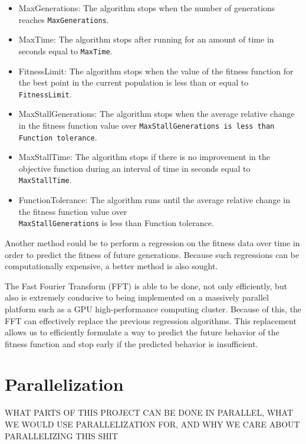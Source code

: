 \documentclass{article}
\renewcommand{\_}{\ifincsname_\else\legacyunderscore\fi}
\begin{document}
\begin{itemize}
    \item MaxGenerations: The algorithm stops when the number of generations reaches \texttt{MaxGenerations}.
    
    \item MaxTime: The algorithm stops after running for an amount of time in seconds equal to \texttt{MaxTime}.
    
    \item FitnessLimit: The algorithm stops when the value of the fitness function for the best point in the current population is less than or equal to \texttt{FitnessLimit}.
    
    \item MaxStallGenerations: The algorithm stops when the average relative change in the fitness function value over \texttt{MaxStallGenerations is less than Function tolerance}.
    
    \item MaxStallTime: The algorithm stops if there is no improvement in the objective function during an interval of time in seconds equal to \texttt{MaxStallTime}.
    
    \item FunctionTolerance: The algorithm runs until the average relative change in the fitness function value over\\ \texttt{MaxStallGenerations} is less than Function tolerance.
\end{itemize}

Another method could be to perform a regression on the fitness data over time in order to predict the fitness of future generations.  Because such regressions can be computationally expensive, a better method is also sought.  

The Fast Fourier Transform (FFT) is able to be done, not only efficiently, but also is extremely conducive to being implemented on a massively parallel platform such as a GPU high-performance computing cluster.  Because of this, the FFT can effectively replace the previous regression algorithms.  This replacement allows us to efficiently formulate a way to predict the future behavior of the fitness function and stop early if the predicted behavior is insufficient.

\section*{Parallelization}
WHAT PARTS OF THIS PROJECT CAN BE DONE IN PARALLEL, WHAT WE WOULD USE PARALLELIZATION FOR, AND WHY WE CARE ABOUT PARALLELIZING THIS SHIT
\end{document}
